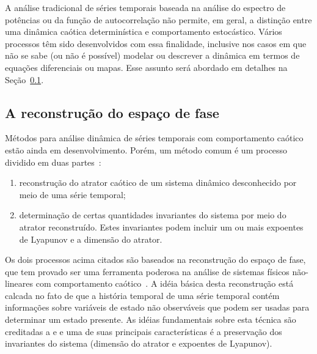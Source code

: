 A análise tradicional de séries temporais baseada na análise do espectro de potências ou da função de autocorrelação não permite, em geral, a distinção entre uma dinâmica caótica determinística e comportamento estocástico. Vários processos têm sido desenvolvidos com essa finalidade, inclusive nos casos em que não se sabe (ou não é possível) modelar ou descrever a dinâmica em termos de equações diferenciais ou mapas. Esse assunto será abordado em detalhes na Seção~\ref{subsecreconst}.

\subsection{A reconstrução do espaço de fase}

\label{subsecreconst}
Métodos para análise dinâmica de séries temporais com comportamento caótico estão ainda em desenvolvimento. Porém, um método comum é um processo dividido em duas partes~\cite{gollub/98}: 
\begin{enumerate}
\item reconstrução do atrator caótico de um sistema dinâmico desconhecido por meio de uma série temporal;

\item determinação de certas quantidades invariantes do sistema por meio do atrator reconstruído. Estes invariantes podem incluir um ou mais expoentes de Lyapunov e a dimensão do atrator. 
\end{enumerate}

Os dois processos acima citados são baseados na reconstrução do espaço de fase, que tem provado ser uma ferramenta poderosa na análise de sistemas físicos não-lineares com comportamento caótico~\cite{argyris/94}. A idéia básica desta reconstrução está calcada no fato de que a história temporal de uma série temporal contém informações sobre variáveis de estado não observáveis que podem ser usadas para determinar um estado presente. As idéias fundamentais sobre esta técnica são creditadas a  e  e uma de suas principais características é a preservação dos invariantes do sistema (dimensão do atrator e expoentes de Lyapunov).

